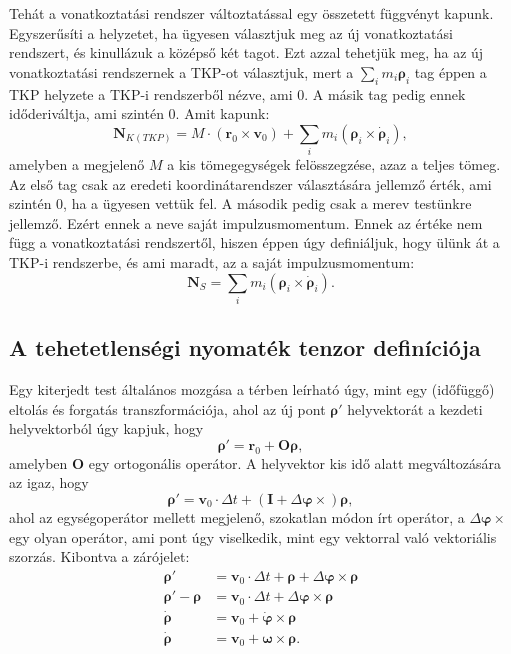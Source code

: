 \documentclass[12pt,a4paper]{scrartcl}
\let\mathbf\bm
\begin{document}
Tehát a vonatkoztatási rendszer változtatással egy összetett függvényt kapunk. Egyszerűsíti a helyzetet, ha ügyesen választjuk meg az új vonatkoztatási rendszert, és kinullázuk a középső két tagot. Ezt azzal tehetjük meg, ha az új vonatkoztatási rendszernek a TKP-ot választjuk, mert a ${\sum\limits_i {{m_i}{{\mathbf{\rho }}_i}} }$ tag éppen a TKP helyzete a TKP-i rendszerből nézve, ami 0. A másik tag pedig ennek időderiváltja, ami szintén 0. Amit kapunk:
\[{{\mathbf{N}}_{K\left( {TKP} \right)}} = M \cdot \left( {{{\mathbf{r}}_0} \times {{\mathbf{v}}_0}} \right) + \sum\limits_i {{m_i}\left( {{{\mathbf{\rho }}_i} \times {{{\mathbf{\dot \rho }}}_i}} \right)}, \]
amelyben a megjelenő $M$ a kis tömegegységek felösszegzése, azaz a teljes tömeg. Az első tag csak az eredeti koordinátarendszer választására jellemző érték, ami szintén 0, ha a ügyesen vettük fel. A második pedig csak a merev testünkre jellemző. Ezért ennek a neve saját impulzusmomentum. Ennek az értéke nem függ a vonatkoztatási rendszertől, hiszen éppen úgy definiáljuk, hogy ülünk át a TKP-i rendszerbe, és ami maradt, az a saját impulzusmomentum:
\[{{\mathbf{N}}_S} = \sum\limits_i {{m_i}\left( {{{\mathbf{\rho }}_i} \times {{{\mathbf{\dot \rho }}}_i}} \right)} .\]

\subsection{A tehetetlenségi nyomaték tenzor definíciója}
Egy kiterjedt test általános mozgása a térben leírható úgy, mint egy (időfüggő) eltolás és forgatás transzformációja, ahol az új pont ${\mathbf{\rho }}'$ helyvektorát a kezdeti helyvektorból úgy kapjuk, hogy
\[{\mathbf{\rho }}' = {{\mathbf{r}}_0} + {\mathbf{O\rho }},\]
amelyben ${\mathbf{O}}$ egy ortogonális operátor. A helyvektor kis idő alatt megváltozására az igaz, hogy
\[{\mathbf{\rho }}' = {{\mathbf{v}}_0} \cdot \Delta t + \left( {{\mathbf{I}} + \Delta {\mathbf{\varphi }} \times } \right){\mathbf{\rho }},\]
ahol az egységoperátor mellett megjelenő, szokatlan módon írt operátor, a ${\Delta {\mathbf{\varphi }} \times }$ egy olyan operátor, ami pont úgy viselkedik, mint egy vektorral való vektoriális szorzás. Kibontva a zárójelet:
\[\begin{aligned}
  {\mathbf{\rho }}' &  = {{\mathbf{v}}_0} \cdot \Delta t + {\mathbf{\rho }} + \Delta {\mathbf{\varphi }} \times {\mathbf{\rho }} \\ 
  {\mathbf{\rho }}' - {\mathbf{\rho }} &  = {{\mathbf{v}}_0} \cdot \Delta t + \Delta {\mathbf{\varphi }} \times {\mathbf{\rho }} \\ 
  {\mathbf{\dot \rho }} &  = {{\mathbf{v}}_0} + {\mathbf{\dot \varphi }} \times {\mathbf{\rho }} \\ 
  {\mathbf{\dot \rho }} &  = {{\mathbf{v}}_0} + {\mathbf{\omega }} \times {\mathbf{\rho }}. \\ 
\end{aligned} \]
\end{document}
